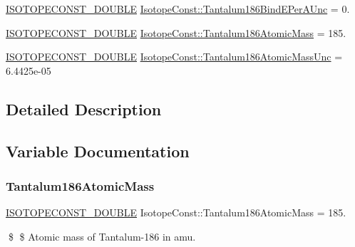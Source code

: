 \begin{DoxyCompactItemize}
\mbox{\hyperlink{group___isotope_const-_macros_ga8f45a7272ce02c0b4c65c44636ed719a}{I\+S\+O\+T\+O\+P\+E\+C\+O\+N\+S\+T\+\_\+\+D\+O\+U\+B\+LE}} \mbox{\hyperlink{group___isotope_const-_tantalum-_ta186_ga26e7acb0c73b26e491c91e134ea152f7}{Isotope\+Const\+::\+Tantalum186\+Bind\+E\+Per\+A\+Unc}} = 0.
\item 
\mbox{\hyperlink{group___isotope_const-_macros_ga8f45a7272ce02c0b4c65c44636ed719a}{I\+S\+O\+T\+O\+P\+E\+C\+O\+N\+S\+T\+\_\+\+D\+O\+U\+B\+LE}} \mbox{\hyperlink{group___isotope_const-_tantalum-_ta186_ga8a2c3f35460fafb024920b948c3b257f}{Isotope\+Const\+::\+Tantalum186\+Atomic\+Mass}} = 185.
\item 
\mbox{\hyperlink{group___isotope_const-_macros_ga8f45a7272ce02c0b4c65c44636ed719a}{I\+S\+O\+T\+O\+P\+E\+C\+O\+N\+S\+T\+\_\+\+D\+O\+U\+B\+LE}} \mbox{\hyperlink{group___isotope_const-_tantalum-_ta186_gaa6716788450775c81e30006e2488c711}{Isotope\+Const\+::\+Tantalum186\+Atomic\+Mass\+Unc}} = 6.\+4425e-\/05
\end{DoxyCompactItemize}


\subsection{Detailed Description}


\subsection{Variable Documentation}
\mbox{\label{group___isotope_const-_tantalum-_ta186_ga8a2c3f35460fafb024920b948c3b257f}} 
\subsubsection{\texorpdfstring{Tantalum186\+Atomic\+Mass}{Tantalum186AtomicMass}}
{\footnotesize\ttfamily \mbox{\hyperlink{group___isotope_const-_macros_ga8f45a7272ce02c0b4c65c44636ed719a}{I\+S\+O\+T\+O\+P\+E\+C\+O\+N\+S\+T\+\_\+\+D\+O\+U\+B\+LE}} Isotope\+Const\+::\+Tantalum186\+Atomic\+Mass = 185.}

\$ \$ Atomic mass of Tantalum-\/186 in amu. \mbox{\label{group___isotope_const-_tantalum-_ta186_gaa6716788450775c81e30006e2488c711}} 
